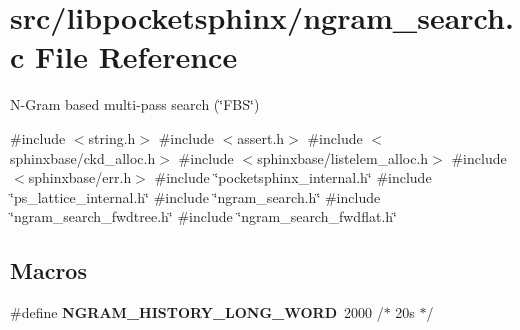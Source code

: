 \section{src/libpocketsphinx/ngram\+\_\+search.c File Reference}
\label{ngram__search_8c}


N-\/\+Gram based multi-\/pass search (\char`\"{}\+F\+B\+S\char`\"{})  


{\ttfamily \#include $<$string.\+h$>$}\newline
{\ttfamily \#include $<$assert.\+h$>$}\newline
{\ttfamily \#include $<$sphinxbase/ckd\+\_\+alloc.\+h$>$}\newline
{\ttfamily \#include $<$sphinxbase/listelem\+\_\+alloc.\+h$>$}\newline
{\ttfamily \#include $<$sphinxbase/err.\+h$>$}\newline
{\ttfamily \#include \char`\"{}pocketsphinx\+\_\+internal.\+h\char`\"{}}\newline
{\ttfamily \#include \char`\"{}ps\+\_\+lattice\+\_\+internal.\+h\char`\"{}}\newline
{\ttfamily \#include \char`\"{}ngram\+\_\+search.\+h\char`\"{}}\newline
{\ttfamily \#include \char`\"{}ngram\+\_\+search\+\_\+fwdtree.\+h\char`\"{}}\newline
{\ttfamily \#include \char`\"{}ngram\+\_\+search\+\_\+fwdflat.\+h\char`\"{}}\newline
\subsection*{Macros}
\begin{DoxyCompactItemize}
\item 
\mbox{\label{ngram__search_8c_af9ad6b3d4ef3ad501da8e2296b25a131}} 
\#define {\bfseries N\+G\+R\+A\+M\+\_\+\+H\+I\+S\+T\+O\+R\+Y\+\_\+\+L\+O\+N\+G\+\_\+\+W\+O\+RD}~2000 /$\ast$ 20s $\ast$/
\end{DoxyCompactItemize}

